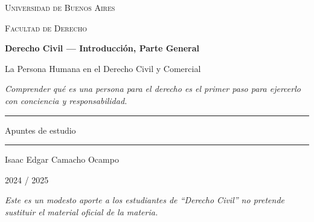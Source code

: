 \documentclass[12pt,oneside]{book}
\newcommand{\universidad}{Universidad de Buenos Aires}
\newcommand{\facultad}{Facultad de Derecho}
\newcommand{\materia}{Derecho Civil --- Introducción, Parte General}
\newcommand{\titulo}{La Persona Humana en el Derecho Civil y Comercial}
\newcommand{\autor}{Isaac Edgar Camacho Ocampo}
\newcommand{\anio}{2024 / 2025}
\begin{document}
\begin{titlepage}

\thispagestyle{empty}

\begin{center}

\vspace*{1cm}

{\large \textsc{\universidad}}

\vspace{0.2cm}

{\large \textsc{\facultad}}

\vspace{3cm}

{\Huge \textbf{\materia}}

\vspace{1cm}

{\LARGE \titulo}

\vspace{0.8cm}

\textit{Comprender qué es una persona para el derecho es el primer paso para ejercerlo con conciencia y responsabilidad.}

\vspace{1.2cm}

\rule{0.70\textwidth}{0.5pt}

\vspace{0.5cm}

{\large Apuntes de estudio}

\vspace{0.5cm}

\rule{0.70\textwidth}{0.5pt}

\vfill

{\large \autor}

\vspace{0.3cm}

{\large \anio}

\end{center}

\vfill

\begin{flushleft}
\textit{Este es un modesto aporte a los estudiantes de ``Derecho Civil'' no pretende sustituir el material oficial de la materia.}
\end{flushleft}

\end{titlepage}

\tableofcontents
\end{document}
